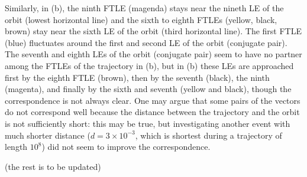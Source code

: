 Similarly, in (b),
the ninth FTLE (magenda) stays near the nineth LE of the orbit
(lowest horizontal line) and the sixth to eighth FTLEs (yellow, black, brown)
stay near the sixth LE of the orbit (third horizontal line).
The first FTLE (blue) fluctuates around the first and second LE of the orbit
(conjugate pair).
The seventh and eighth LEs of the orbit (conjugate pair)
seem to have no partner among the FTLEs of the trajectory
in (b),
but in (b) these LEs are approached
first by the eighth FTLE (brown), then by the seventh (black),
the ninth (magenta), and finally by the sixth and seventh (yellow and black),
though the correspondence is not always clear.
One may argue that some pairs of the vectors do not correspond well
because the distance between the trajectory and the orbit
is not sufficiently short: this may be true, but investigating
another event with much shorter distance
($d = 3 \times 10^{-3}$, which is shortest
during a trajectory of length $10^8$)
did not seem to improve the correspondence.

(the rest is to be updated)
